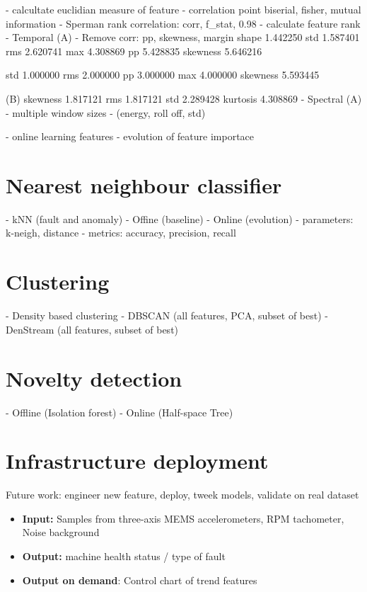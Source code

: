 	- calcultate euclidian measure of feature 
	- correlation point biserial, fisher, mutual information
		- Sperman rank correlation: corr, f\_stat, 0.98
	- calculate feature rank
		- Temporal (A) - Remove corr: pp, skewness, margin
			shape 	1.442250
			std 	1.587401
			rms 	2.620741
			max 	4.308869
			pp 	5.428835
			skewness 	5.646216
			
			std 	1.000000
			rms 	2.000000
			pp 	3.000000
			max 	4.000000
			skewness 	5.593445
			
			(B)			
			skewness	1.817121
			rms	1.817121
			std	2.289428
			kurtosis	4.308869
		- Spectral (A) - multiple window sizes 
			- (energy, roll off, std) 

- online learning features
	- evolution of feature importace

\section{Nearest neighbour classifier}
- kNN (fault and anomaly)
	- Offine (baseline)
	- Online (evolution)
- parameters: k-neigh, distance
- metrics: accuracy, precision, recall

\section{Clustering}
- Density based clustering
	- DBSCAN (all features, PCA, subset of best)
	- DenStream (all features, subset of best)

\section{Novelty detection}
- Offline (Isolation forest)
- Online (Half-space Tree)


\section{Infrastructure deployment}
Future work: engineer new feature, deploy, tweek models, validate on real dataset

 \begin{itemize}
 \itemsep0pt
\item \textbf{Input:} Samples from three-axis MEMS accelerometers, RPM tachometer, Noise background
\item \textbf{Output:} machine health status / type of fault
\item \textbf{Output on demand}: Control chart of trend features
\end{itemize}

